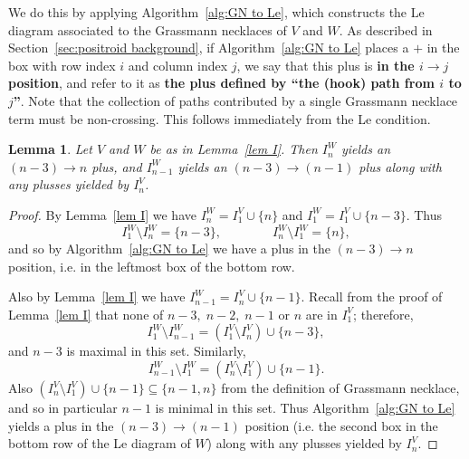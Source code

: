 \documentclass[11pt]{article}
\newtheorem{lem}[thm]{Lemma}
\theoremstyle{remark}
\theoremstyle{definition}
\begin{document}
We do this by applying Algorithm~\ref{alg:GN to Le}, which constructs the Le diagram associated to the Grassmann necklaces of $V$ and $W$. As described in Section~\ref{sec:positroid background}, if Algorithm~\ref{alg:GN to Le} places a $+$ in the box with row index $i$ and column index $j$, we say that this plus is {\bf in the $i \rightarrow j$ position}, and refer to it as {\bf the plus defined by ``the (hook) path from $i$ to $j$''}. Note that the collection of paths contributed by a single Grassmann necklace term must be non-crossing.  This follows immediately from the Le condition.






\begin{lem}\label{lem n and n-1}
Let $V$ and $W$ be as in Lemma~\ref{lem I}.
Then
%
  $I_n^W$ yields an $(n-3)\rightarrow n$ plus, and $I_{n-1}^W$ yields an $(n-3)\rightarrow (n-1)$ plus along with any plusses yielded by $I_n^V$.
\end{lem}

\begin{proof}
By Lemma~\ref{lem I} we have $I_n^{W}= I_1^{V} \cup \{n\}$ and $I_1^{W} = I_1^{V} \cup \{n-3\}$. Thus 
\[I_1^{W} \setminus I_n^{W} = \{n-3\}, \qquad \qquad I_n^{W} \setminus I_1^{W} = \{n\},\]
and so by Algorithm~\ref{alg:GN to Le} we have a plus in the $(n-3) \rightarrow n$ position, i.e. in the leftmost box of the bottom row. 

Also by Lemma~\ref{lem I} we have $I_{n-1}^{W} = I_n^{V} \cup \{n-1\}$. Recall from the proof of Lemma~\ref{lem I} that none of $n-3,\;n-2,\;n-1$ or $n$ are in $I_1^V$; therefore,
\[
I_1^W\setminus I_{n-1}^W = (I_1^V \setminus I_n^V) \cup\{n-3\},
\]
and $n-3$ is maximal in this set. Similarly, 
\[I_{n-1}^W \setminus I_1^W = (I_n^V \setminus I_1^V) \cup \{n-1\}.
\]
Also $(I_n^V \setminus I_1^V) \cup \{n-1\}\subseteq \{n-1,n\}$ from the definition of Grassmann necklace, and so in particular $n-1$ is minimal in this set. Thus Algorithm~\ref{alg:GN to Le} yields a plus in the $(n-3) \rightarrow (n-1)$ position (i.e. the second box in the bottom row of the Le diagram of $W$) along with any plusses yielded by $I_n^V$.
\end{proof} 
\end{document}

